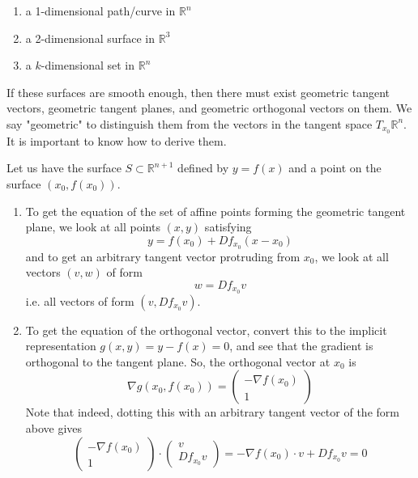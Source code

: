   \begin{enumerate}
		\item a 1-dimensional path/curve in $\mathbb{R}^n$ 
		\item a 2-dimensional surface in $\mathbb{R}^3$ 
		\item a $k$-dimensional set in $\mathbb{R}^n$ 
  \end{enumerate}

  If these surfaces are smooth enough, then there must exist geometric tangent vectors, geometric tangent planes, and geometric orthogonal vectors on them. We say "geometric" to distinguish them from the vectors in the tangent space $T_{x_0} \mathbb{R}^n$. It is important to know how to derive them. 

  \begin{theorem}
		Let us have the surface $S \subset \mathbb{R}^{n+1}$ defined by $y = f(x)$ and a point on the surface $(x_0, f(x_0))$. 
		\begin{enumerate}
			\item To get the equation of the set of affine points forming the geometric tangent plane, we look at all points $(x, y)$ satisfying 
				\begin{equation}
					y = f(x_0) + D f_{x_0} (x - x_0)
				\end{equation}
				and to get an arbitrary tangent vector protruding from $x_0$, we look at all vectors $(v, w)$ of form 
				\begin{equation}
					w = D f_{x_0} v
				\end{equation}
				i.e. all vectors of form $(v, D f_{x_0} v)$. 

			\item To get the equation of the orthogonal vector, convert this to the implicit representation $g(x, y) = y - f(x) = 0$, and see that the gradient is orthogonal to the tangent plane. So, the orthogonal vector at $x_0$ is 
				\begin{equation}
					\nabla g (x_0, f(x_0)) = \begin{pmatrix} - \nabla f(x_0) \\ 1 \end{pmatrix}
				\end{equation}
				Note that indeed, dotting this with an arbitrary tangent vector of the form above gives 
				\begin{equation}
					\begin{pmatrix} -\nabla f(x_0) \\ 1 \end{pmatrix} \cdot \begin{pmatrix} v \\ D f_{x_0} v \end{pmatrix} = - \nabla f(x_0) \cdot v + D f_{x_0} v = 0
				\end{equation}
		\end{enumerate}
  \end{theorem}

